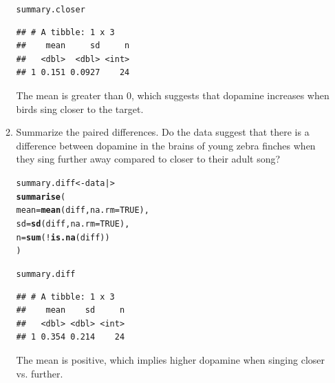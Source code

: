 \documentclass{article}\usepackage[]{graphicx}\usepackage[]{xcolor}
\makeatletter
\newcommand{\hlnum}[1]{\textcolor[rgb]{0.686,0.059,0.569}{#1}}%
\newcommand{\hlopt}[1]{\textcolor[rgb]{0,0,0}{#1}}%
\newcommand{\hldef}[1]{\textcolor[rgb]{0.345,0.345,0.345}{#1}}%
\newcommand{\hlkwb}[1]{\textcolor[rgb]{0.69,0.353,0.396}{#1}}%
\newcommand{\hlkwc}[1]{\textcolor[rgb]{0.333,0.667,0.333}{#1}}%
\newcommand{\hlkwd}[1]{\textcolor[rgb]{0.737,0.353,0.396}{\textbf{#1}}}%
\newenvironment{kframe}{%
 \def\at@end@of@kframe{}%
 \ifinner\ifhmode%
  \def\at@end@of@kframe{\end{minipage}}%
  \begin{minipage}{\columnwidth}%
 \fi\fi%
 \def\FrameCommand##1{\hskip\@totalleftmargin \hskip-\fboxsep
 \colorbox{shadecolor}{##1}\hskip-\fboxsep
     \hskip-\linewidth \hskip-\@totalleftmargin \hskip\columnwidth}%
 \MakeFramed {\advance\hsize-\width
   \@totalleftmargin\z@ \linewidth\hsize
   \@setminipage}}%
 {\par\unskip\endMakeFramed%
 \at@end@of@kframe}
\newenvironment{knitrout}{}{} %
\makeatother
\begin{document}
\begin{enumerate}
\begin{enumerate}
\begin{knitrout}
\begin{kframe}
\begin{alltt}
\hldef{summary.closer}
\end{alltt}
\begin{verbatim}
## # A tibble: 1 x 3
##    mean     sd     n
##   <dbl>  <dbl> <int>
## 1 0.151 0.0927    24
\end{verbatim}
\end{kframe}
\end{knitrout}
  
  The mean is greater than 0, which suggests that dopamine increases when birds sing closer to the target.
   
  \item Summarize the paired differences. Do the data suggest
  that there is a difference between dopamine in the brains of
  young zebra finches when they sing further away compared to 
  closer to their adult song?
\begin{knitrout}
\color{fgcolor}\begin{kframe}
\begin{alltt}
\hldef{summary.diff} \hlkwb{<-} \hldef{data |>}
  \hlkwd{summarise}\hldef{(}
    \hlkwc{mean} \hldef{=} \hlkwd{mean}\hldef{(diff,} \hlkwc{na.rm} \hldef{=} \hlnum{TRUE}\hldef{),}
    \hlkwc{sd} \hldef{=} \hlkwd{sd}\hldef{(diff,} \hlkwc{na.rm} \hldef{=} \hlnum{TRUE}\hldef{),}
    \hlkwc{n} \hldef{=} \hlkwd{sum}\hldef{(}\hlopt{!}\hlkwd{is.na}\hldef{(diff))}
  \hldef{)}

\hldef{summary.diff}
\end{alltt}
\begin{verbatim}
## # A tibble: 1 x 3
##    mean    sd     n
##   <dbl> <dbl> <int>
## 1 0.354 0.214    24
\end{verbatim}
\end{kframe}
\end{knitrout}

  The mean is positive, which implies higher dopamine when singing closer vs. further.
  

\end{enumerate}
\end{enumerate}
\end{document}
